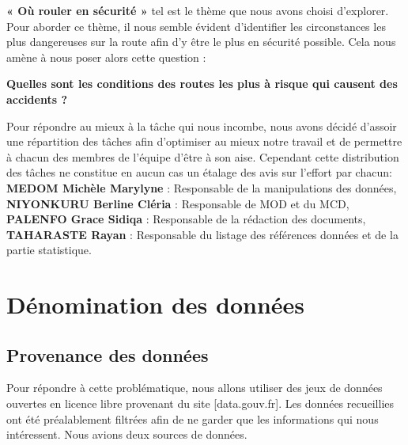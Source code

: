 \documentclass[mstat,12pt]{unswthesis}
\begin{document}
\medskip

\textbf{« Où rouler en sécurité » } tel est le thème que nous avons
choisi d'explorer. Pour aborder ce thème, il nous semble évident
d'identifier les circonstances les plus dangereuses sur la route afin
d'y être le plus en sécurité possible. Cela nous amène à nous poser
alors cette question :

\bigskip

\centering

\textbf{Quelles sont les conditions des routes les plus à risque qui
causent des accidents ?}

\bigskip

\justifying

Pour répondre au mieux à la tâche qui nous incombe, nous avons décidé
d'assoir une répartition des tâches afin d'optimiser au mieux notre
travail et de permettre à chacun des membres de l'équipe d'être à son
aise. Cependant cette distribution des tâches ne constitue en aucun cas
un étalage des avis sur l'effort par chacun:\\
\textbf{MEDOM Michèle Marylyne } : Responsable de la manipulations des
données,\\
\textbf{NIYONKURU Berline Cléria } : Responsable de MOD et du MCD,\\
\textbf{PALENFO Grace Sidiqa } : Responsable de la rédaction des
documents,\\
\textbf{TAHARASTE Rayan } : Responsable du listage des références
données et de la partie statistique.

\bigskip

\hypertarget{duxe9nomination-des-donnuxe9es}{%
\chapter{Dénomination des
données}\label{duxe9nomination-des-donnuxe9es}}

\hypertarget{provenance-des-donnuxe9es}{%
\section{Provenance des données}\label{provenance-des-donnuxe9es}}

Pour répondre à cette problématique, nous allons utiliser des jeux de
données ouvertes en licence libre provenant du site {[}data.gouv.fr{]}.
Les données recueillies ont été préalablement filtrées afin de ne garder
que les informations qui nous intéressent. Nous avions deux sources de
données.
\end{document}
